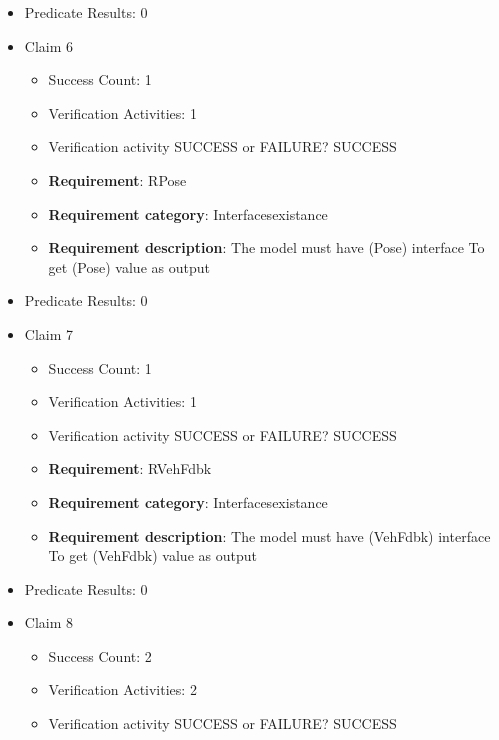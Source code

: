 \documentclass{article}
\begin{document}
\begin{itemize}
									    
				\item Predicate Results: 0

  				  \item Claim 6
				\begin{itemize}
			    	\item Success Count: 1 
			    	\item Verification Activities: 1
					\item Verification activity SUCCESS or FAILURE? SUCCESS
		
						\item \textbf{Requirement}: RPose 
						\item \textbf{Requirement category}: Interfacesexistance 
						\item \textbf{Requirement description}: The model must have (Pose) interface To get (Pose) value as output
					
				\end{itemize}
				
									    
				\item Predicate Results: 0

  				  \item Claim 7
				\begin{itemize}
			    	\item Success Count: 1 
			    	\item Verification Activities: 1
					\item Verification activity SUCCESS or FAILURE? SUCCESS
		
						\item \textbf{Requirement}: RVehFdbk 
						\item \textbf{Requirement category}: Interfacesexistance 
						\item \textbf{Requirement description}: The model must have (VehFdbk) interface To get (VehFdbk) value as output
					
				\end{itemize}
				
									    
				\item Predicate Results: 0

  				  \item Claim 8
				\begin{itemize}
			    	\item Success Count: 2 
			    	\item Verification Activities: 2
					\item Verification activity SUCCESS or FAILURE? SUCCESS
		

\end{itemize}
\end{itemize}
\end{document}
